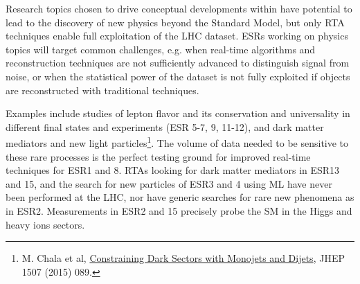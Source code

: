 
\noindent {\color{blue}{2. The \acronym program of searches and measurement could lead to breakthroughs in our understanding of nature}}
Research topics chosen to drive conceptual developments within \acronym have potential to lead to the discovery of new physics beyond the Standard Model, but only RTA techniques enable full exploitation of the LHC dataset. 
ESRs working on physics topics will target common challenges, e.g. when real-time algorithms and reconstruction techniques are not sufficiently advanced to distinguish signal from noise, or when the statistical power of the dataset is not fully exploited if objects are reconstructed with traditional techniques. 

Examples include studies of lepton flavor and its conservation and universality in different final states and experiments (ESR 5-7, 9, 11-12), and dark matter mediators and new light particles\footnote{M. Chala et al, \href{http://arxiv.org/abs/1503.05916}{Constraining Dark Sectors with Monojets and Dijets}, JHEP 1507 (2015) 089.}.
The volume of data needed to be sensitive to these rare processes is the perfect testing ground for improved real-time techniques for ESR1 and 8.  
RTAs looking for dark matter mediators in ESR13 and 15, and the search for new particles of ESR3 and 4 using ML have never been performed at the LHC, nor have generic searches for rare new phenomena as in ESR2.
Measurements in ESR2 and 15 precisely probe the SM in the Higgs and heavy ions sectors. 

